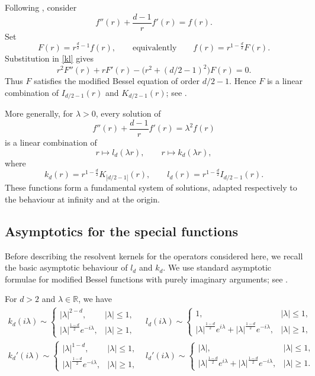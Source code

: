 \documentclass[12pt]{amsart}
\begin{document}
Following \cite{HS1D}, consider
\begin{equation}\label{kl}
f''(r)+\frac{d-1}{r}f'(r)=f(r).
\end{equation}
Set
\[
F(r)=r^{\frac d2-1}f(r),
\qquad\text{equivalently}\qquad
f(r)=r^{1-\frac d2}F(r).
\]
Substitution in \eqref{kl} gives
\begin{equation}\label{bessel_mod}
r^2F''(r)+rF'(r)-\bigl(r^2+(d/2-1)^2\bigr)F(r)=0.
\end{equation}
Thus \(F\) satisfies the modified Bessel equation of order \(d/2-1\). Hence
\(F\) is a linear combination of \(I_{d/2-1}(r)\) and \(K_{d/2-1}(r)\);
see \cite[\S~9.6.1]{AS}.

More generally, for \(\lambda>0\), every solution of
\begin{equation}\label{wuj}
f''(r)+\frac{d-1}{r}f'(r)=\lambda^2 f(r)
\end{equation}
is a linear combination of
\[
r\mapsto l_d(\lambda r),
\qquad
r\mapsto k_d(\lambda r),
\]
where
\begin{equation}\label{kd_ld_def}
k_d(r)=r^{1-\frac d2}K_{|d/2-1|}(r),
\qquad
l_d(r)=r^{1-\frac d2}I_{d/2-1}(r).
\end{equation}
These functions form a fundamental system of solutions, adapted respectively
to the behaviour at infinity and at the origin.

\subsection{Asymptotics for the special functions}

Before describing the resolvent kernels for the operators considered here, we
recall the basic asymptotic behaviour of \(l_d\) and \(k_d\). We use standard
asymptotic formulae for modified Bessel functions with purely imaginary
arguments; see \cite{AS}.

For \(d>2\) and \(\lambda\in\mathbb R\), we have
\[
\begin{array}{ll}
\displaystyle
k_d(i\lambda)\sim
\begin{cases}
|\lambda|^{2-d}, & |\lambda|\leq 1,\\
|\lambda|^{\frac{1-d}{2}}e^{-i\lambda}, & |\lambda|\geq 1,
\end{cases}
&
\displaystyle
l_d(i\lambda)\sim
\begin{cases}
1, & |\lambda|\leq 1,\\
|\lambda|^{\frac{1-d}{2}}e^{i\lambda}
+
|\lambda|^{\frac{1-d}{2}}e^{-i\lambda}, & |\lambda|\geq 1,
\end{cases}
\\[6mm]
\displaystyle
k_d'(i\lambda)\sim
\begin{cases}
|\lambda|^{1-d}, & |\lambda|\leq 1,\\
|\lambda|^{\frac{1-d}{2}}e^{-i\lambda}, & |\lambda|\geq 1,
\end{cases}
&
\displaystyle
l_d'(i\lambda)\sim
\begin{cases}
|\lambda|, & |\lambda|\leq 1,\\
|\lambda|^{\frac{1-d}{2}}e^{i\lambda}
+
|\lambda|^{\frac{1-d}{2}}e^{-i\lambda}, & |\lambda|\geq 1.
\end{cases}
\end{array}
\]
\end{document}
